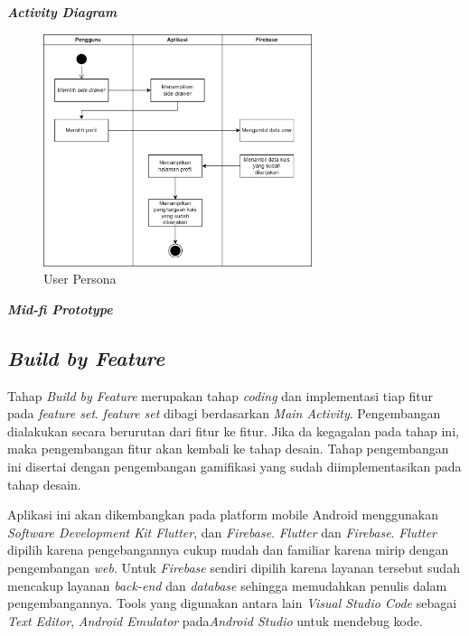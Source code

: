\textbf{\textit{Activity Diagram}}
\begin{figure}[H]
	\centering
	\includegraphics[width=0.7\textwidth]{contents/chapter-3/images/AD-profil.png}
	\caption[Caption]{User Persona}
	\label{Fig:UserPersona}
\end{figure}

\textbf{\textit{Mid-fi Prototype}}

\subsection{\textit{Build by Feature}}
Tahap \textit{Build by Feature} merupakan tahap \textit{coding} dan implementasi tiap fitur pada \textit{feature set}.
\textit{feature set} dibagi berdasarkan \textit{Main Activity}. Pengembangan dialakukan secara berurutan dari fitur ke fitur.
Jika da kegagalan pada tahap ini, maka pengembangan fitur akan kembali ke tahap desain.
Tahap pengembangan ini disertai dengan pengembangan gamifikasi yang sudah diimplementasikan pada tahap desain.

Aplikasi ini akan dikembangkan pada platform mobile Android menggunakan \textit{Software Development Kit Flutter}, dan \textit{Firebase}.
\textit{Flutter} dan \textit{Firebase}. \textit{Flutter} dipilih karena pengebangannya cukup mudah dan familiar karena mirip dengan pengembangan \textit{web}.
Untuk \textit{Firebase} sendiri dipilih karena layanan tersebut sudah mencakup layanan \textit{back-end} dan \textit{database} sehingga memudahkan penulis dalam pengembangannya.
Tools yang digunakan antara lain \textit{Visual Studio Code} sebagai \textit{Text Editor}, \textit{Android Emulator} pada\textit{Android Studio} untuk mendebug kode.

